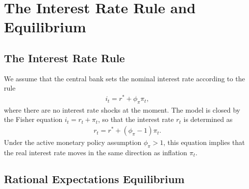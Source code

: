 \documentclass[notitlepage,a4paper,11pt]{report}
\numberwithin{section}{chapter}
\numberwithin{subsection}{section}
\begin{document}
\pagebreak



\section{The Interest Rate Rule and Equilibrium}

\subsection{The Interest Rate Rule}

We assume that the central bank sets the nominal interest rate according to the rule 
\begin{align*}
i_t = r^* + \phi_{\pi} \pi_t, 
\end{align*}
where there are no interest rate shocks at the moment. The model is closed by the Fisher equation $i_t = r_t + \pi_t$, so that the interest rate $r_t$ is determined as 
\begin{align*}
r_t = r^* + (\phi_{\pi} -1 )\pi_t. 
\end{align*}
Under the active monetary policy assumption $\phi_{\pi} >1$, this equation implies that the real interest rate moves in the same direction as inflation $\pi_t$. \\


\vspace{1cm}


\subsection{Rational Expectations Equilibrium}
\end{document}
